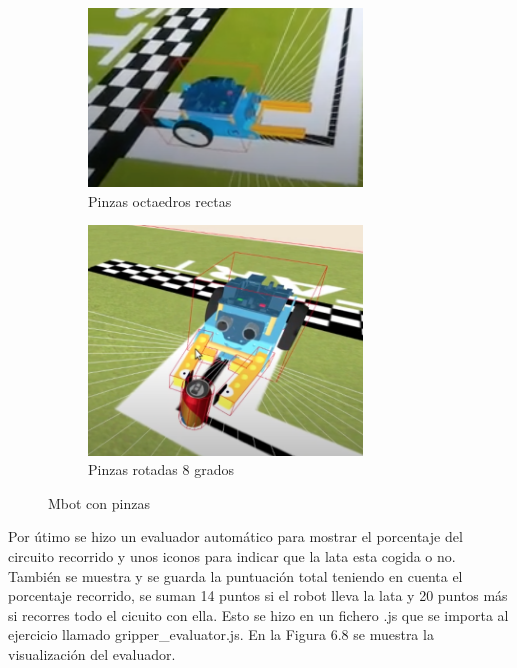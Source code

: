 \begin{figure}[H]
  \begin{subfigure}[b]{0.5\textwidth}
  \centering
    \includegraphics[width=0.8\textwidth, height=0.5\textwidth]{chapters/images/pinzarecta.png}
    \caption{Pinzas octaedros rectas}
    \label{fig:f1}
  \end{subfigure}
  \hfill
  \begin{subfigure}[b]{0.5\textwidth}
  \centering
    \includegraphics[width=0.8\textwidth, height=0.5\textwidth]{chapters/images/pinzaok.png}
	\caption{Pinzas rotadas 8 grados}    
    \label{fig:f2}
 
  \end{subfigure}
  \caption{Mbot con pinzas}
\end{figure}

Por útimo se hizo un evaluador automático para mostrar el porcentaje del circuito recorrido y unos iconos para indicar que la lata esta cogida o no. También se muestra y se guarda la puntuación total teniendo en cuenta el porcentaje recorrido, se suman 14 puntos si el robot lleva la lata y 20 puntos más si recorres todo el cicuito con ella. Esto se hizo en un fichero .js que se importa al ejercicio llamado gripper\_evaluator.js. En la Figura 6.8 se muestra la visualización del evaluador.

